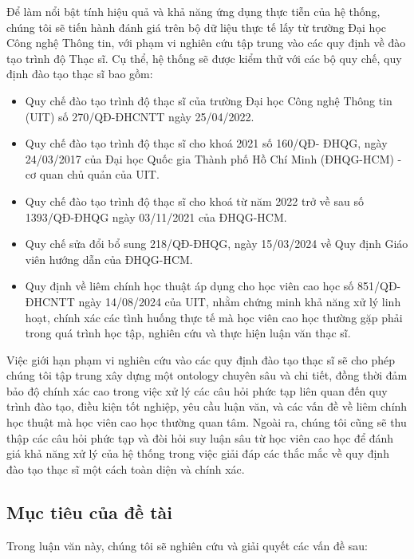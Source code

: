 \documentclass[a4paper,12pt]{article}
\begin{document}
Để làm nổi bật tính hiệu quả và khả năng ứng dụng thực tiễn của hệ thống, chúng tôi sẽ tiến hành đánh giá trên bộ dữ liệu thực tế lấy từ trường Đại học Công nghệ Thông tin, với phạm vi nghiên cứu tập trung vào các quy định về đào tạo trình độ Thạc sĩ.
Cụ thể, hệ thống sẽ được kiểm thử với các bộ quy chế, quy định đào tạo thạc sĩ bao gồm: 
\begin{itemize}
    \item Quy chế đào tạo trình độ thạc sĩ của trường Đại học Công nghệ Thông tin (UIT) số 270/QĐ-ĐHCNTT ngày 25/04/2022.
    \item Quy chế đào tạo trình độ thạc sĩ cho khoá 2021 số 160/QĐ- ĐHQG, ngày 24/03/2017 của Đại học Quốc gia Thành phố Hồ Chí Minh (ĐHQG-HCM) - cơ quan chủ quản của UIT.
    \item Quy chế đào tạo trình độ thạc sĩ cho khoá từ năm 2022 trở về sau số 1393/QĐ-ĐHQG ngày 03/11/2021 của ĐHQG-HCM.
    \item Quy chế  sửa đổi bổ sung 218/QĐ-ĐHQG, ngày 15/03/2024 về Quy định Giáo viên hướng dẫn của ĐHQG-HCM.
    \item Quy định về liêm chính học thuật áp dụng cho học viên cao học số 851/QĐ-ĐHCNTT ngày 14/08/2024 của UIT, nhằm chứng minh khả năng xử lý linh hoạt, chính xác các tình huống thực tế mà học viên cao học thường gặp phải trong quá trình học tập, nghiên cứu và thực hiện luận văn thạc sĩ.
\end{itemize}

Việc giới hạn phạm vi nghiên cứu vào các quy định đào tạo thạc sĩ sẽ cho phép chúng tôi tập trung xây dựng một ontology chuyên sâu và chi tiết, đồng thời đảm bảo độ chính xác cao trong việc xử lý các câu hỏi phức tạp liên quan đến quy trình đào tạo, điều kiện tốt nghiệp, yêu cầu luận văn, và các vấn đề về liêm chính học thuật mà học viên cao học thường quan tâm.
Ngoài ra, chúng tôi cũng sẽ thu thập các câu hỏi phức tạp và đòi hỏi suy luận sâu từ học viên cao học để đánh giá khả năng xử lý của hệ thống trong việc giải đáp các thắc mắc về quy định đào tạo thạc sĩ một cách toàn diện và chính xác.

\subsection{Mục tiêu của đề tài}

Trong luận văn này, chúng tôi sẽ nghiên cứu và giải quyết các vấn đề sau:
\end{document}
